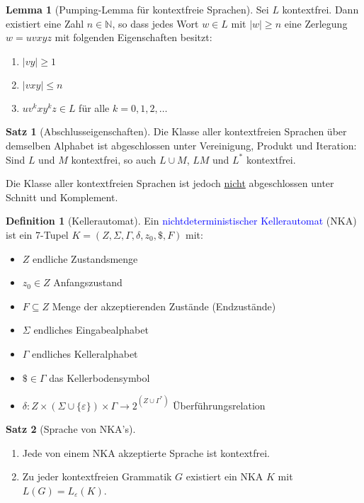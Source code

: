\documentclass{scrreprt}
\theoremstyle{definition}
\newtheorem{Definition}{Definition}[section]
\newtheorem{Satz}{Satz}[section]
\newtheorem{Lemma}{Lemma}[section]
\theoremstyle{example}
\theoremstyle{algorithm}
\begin{document}
\begin{Lemma}[Pumping-Lemma für kontextfreie Sprachen]
Sei $L$ kontextfrei. Dann existiert eine Zahl $n \in \mathbb{N}$, so dass jedes Wort $w \in L$ mit $|w| \geq n$ eine Zerlegung $w=uvxyz$ mit folgenden Eigenschaften besitzt:
\begin{enumerate}
\item
$|vy|\geq 1$
\item
$|vxy| \leq n$
\item
$uv^kxy^kz \in L$ für alle $k=0,1,2,\ldots$
\end{enumerate}
\end{Lemma}

\begin{Satz}[Abschlusseigenschaften]
Die Klasse aller kontextfreien Sprachen über demselben Alphabet ist abgeschlossen unter Vereinigung, Produkt und Iteration: Sind $L$ und $M$ kontextfrei, so auch $L \cup M$, $LM$ und $L^*$ kontextfrei.\par
Die Klasse aller kontextfreien Sprachen ist jedoch \underline{nicht} abgeschlossen unter Schnitt und Komplement.
\end{Satz}

\begin{Definition}[Kellerautomat]
Ein \textcolor{blue}{nichtdeterministischer Kellerautomat} (NKA) ist ein 7-Tupel $K=(Z,\Sigma,\Gamma,\delta,z_0,\$,F)$ mit:
\begin{itemize}
\item
$Z$ endliche Zustandsmenge
\item
$z_0 \in Z$ Anfangszustand
\item
$F\subseteq Z$ Menge der akzeptierenden Zustände (Endzustände)
\item
$\Sigma$ endliches Eingabealphabet
\item
$\Gamma$ endliches Kelleralphabet
\item
$\$\in\Gamma$ das Kellerbodensymbol
\item
$\delta : Z \times (\Sigma\cup\{\varepsilon\}) \times \Gamma \rightarrow 2^{(Z\cup\Gamma^*)}$ Überführungsrelation
\end{itemize}
\end{Definition}

\begin{Satz}[Sprache von NKA's]
\noindent
\begin{enumerate}[1)]
\item
Jede von einem NKA akzeptierte Sprache ist kontextfrei.
\item
Zu jeder kontextfreien Grammatik $G$ existiert ein NKA $K$ mit ${L(G)=L_\varepsilon(K)}$.
\end{enumerate}
\end{Satz}
\end{document}
